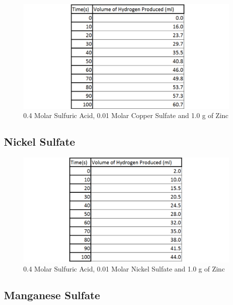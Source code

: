\begin{figure}[H]
    \includegraphics[width=\textwidth]{./Experiment/Images/4DifferentCatalysts/Copper.pdf}
    \caption{0.4 Molar Sulfuric Acid, 0.01 Molar Copper Sulfate and 1.0 g of Zinc} \label{fig:001MolarAverage}
\end{figure}

	\subsection{Nickel Sulfate}

\begin{figure}[H]
    \includegraphics[width=\textwidth]{./Experiment/Images/4DifferentCatalysts/Nickel.pdf}
    \caption{0.4 Molar Sulfuric Acid, 0.01 Molar Nickel Sulfate and 1.0 g of Zinc} \label{fig:NickelRawData}
\end{figure}

	\subsection{Manganese Sulfate}

